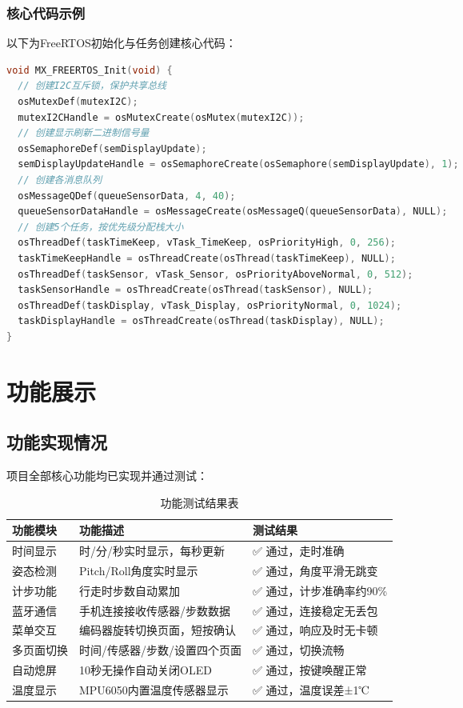 \documentclass[12pt, a4paper]{ctexart}
\begin{document}
\subsubsection{核心代码示例}
以下为FreeRTOS初始化与任务创建核心代码：
\begin{lstlisting}[language=C, caption=FreeRTOS初始化核心代码]
void MX_FREERTOS_Init(void) {
  // 创建I2C互斥锁，保护共享总线
  osMutexDef(mutexI2C);
  mutexI2CHandle = osMutexCreate(osMutex(mutexI2C));
  // 创建显示刷新二进制信号量
  osSemaphoreDef(semDisplayUpdate);
  semDisplayUpdateHandle = osSemaphoreCreate(osSemaphore(semDisplayUpdate), 1);
  // 创建各消息队列
  osMessageQDef(queueSensorData, 4, 40);
  queueSensorDataHandle = osMessageCreate(osMessageQ(queueSensorData), NULL);
  // 创建5个任务，按优先级分配栈大小
  osThreadDef(taskTimeKeep, vTask_TimeKeep, osPriorityHigh, 0, 256);
  taskTimeKeepHandle = osThreadCreate(osThread(taskTimeKeep), NULL);
  osThreadDef(taskSensor, vTask_Sensor, osPriorityAboveNormal, 0, 512);
  taskSensorHandle = osThreadCreate(osThread(taskSensor), NULL);
  osThreadDef(taskDisplay, vTask_Display, osPriorityNormal, 0, 1024);
  taskDisplayHandle = osThreadCreate(osThread(taskDisplay), NULL);
}
\end{lstlisting}

\section{功能展示}
\subsection{功能实现情况}
项目全部核心功能均已实现并通过测试：
\begin{table}[htbp]
\centering
\caption{功能测试结果表}
\label{tab:func_test}
\begin{tabular}{lll}
\toprule
功能模块 & 功能描述 & 测试结果 \\
\midrule
时间显示 & 时/分/秒实时显示，每秒更新 & ✅ 通过，走时准确 \\
姿态检测 & Pitch/Roll角度实时显示 & ✅ 通过，角度平滑无跳变 \\
计步功能 & 行走时步数自动累加 & ✅ 通过，计步准确率约90\% \\
蓝牙通信 & 手机连接接收传感器/步数数据 & ✅ 通过，连接稳定无丢包 \\
菜单交互 & 编码器旋转切换页面，短按确认 & ✅ 通过，响应及时无卡顿 \\
多页面切换 & 时间/传感器/步数/设置四个页面 & ✅ 通过，切换流畅 \\
自动熄屏 & 10秒无操作自动关闭OLED & ✅ 通过，按键唤醒正常 \\
温度显示 & MPU6050内置温度传感器显示 & ✅ 通过，温度误差±1℃ \\
\bottomrule
\end{tabular}
\end{table}
\end{document}
